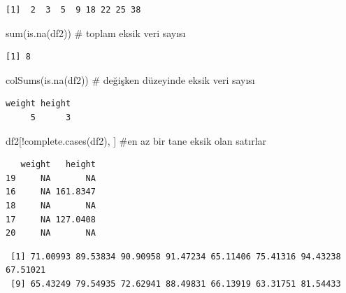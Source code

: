 \documentclass[
  letterpaper,
  DIV=11,
  numbers=noendperiod]{scrreprt}
\newenvironment{Shaded}{\begin{snugshade}}{\end{snugshade}}
\newcommand{\CommentTok}[1]{\textcolor[rgb]{0.37,0.37,0.37}{#1}}
\newcommand{\FunctionTok}[1]{\textcolor[rgb]{0.28,0.35,0.67}{#1}}
\newcommand{\NormalTok}[1]{\textcolor[rgb]{0.00,0.23,0.31}{#1}}
\newcommand{\SpecialCharTok}[1]{\textcolor[rgb]{0.37,0.37,0.37}{#1}}
\begin{document}
\begin{verbatim}
[1]  2  3  5  9 18 22 25 38
\end{verbatim}

\begin{Shaded}
\begin{Highlighting}[]
\FunctionTok{sum}\NormalTok{(}\FunctionTok{is.na}\NormalTok{(df2)) }\CommentTok{\# toplam eksik veri sayısı}
\end{Highlighting}
\end{Shaded}

\begin{verbatim}
[1] 8
\end{verbatim}

\begin{Shaded}
\begin{Highlighting}[]
\FunctionTok{colSums}\NormalTok{(}\FunctionTok{is.na}\NormalTok{(df2)) }\CommentTok{\# değişken düzeyinde eksik veri sayısı}
\end{Highlighting}
\end{Shaded}

\begin{verbatim}
weight height 
     5      3 
\end{verbatim}

\begin{Shaded}
\begin{Highlighting}[]
\NormalTok{df2[}\SpecialCharTok{!}\FunctionTok{complete.cases}\NormalTok{(df2), ] }\CommentTok{\#en az bir tane eksik olan satırlar}
\end{Highlighting}
\end{Shaded}

\begin{verbatim}
   weight   height
19     NA       NA
16     NA 161.8347
18     NA       NA
17     NA 127.0408
20     NA       NA
\end{verbatim}

\begin{Shaded}
\end{Shaded}

\begin{verbatim}
 [1] 71.00993 89.53834 90.90958 91.47234 65.11406 75.41316 94.43238 67.51021
 [9] 65.43249 79.54935 72.62941 88.49831 66.13919 63.31751 81.54433
\end{verbatim}
\end{document}
